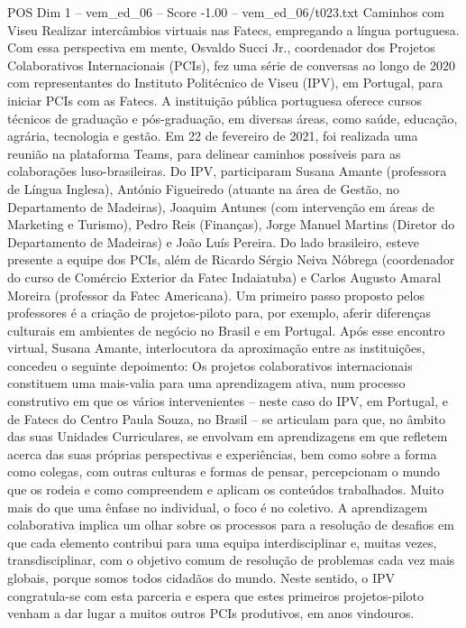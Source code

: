 \begin{textsample}{POS Dim 1 – vem\_ed\_06 – Score -1.00 – vem\_ed\_06/t023.txt}  \label{ex:f1_pos_066}
Caminhos com Viseu Realizar intercâmbios virtuais nas Fatecs, empregando a língua portuguesa.
Com essa perspectiva em mente, Osvaldo Succi Jr., coordenador dos Projetos Colaborativos Internacionais (PCIs), fez uma série de conversas ao longo de 2020 com representantes do Instituto Politécnico de Viseu (IPV), em Portugal, para iniciar PCIs com as Fatecs.
A instituição pública portuguesa oferece cursos técnicos de graduação e pós-graduação, em diversas áreas, como saúde, educação, agrária, tecnologia e gestão.
Em 22 de fevereiro de 2021, foi realizada uma reunião na plataforma Teams, para delinear caminhos possíveis para as colaborações luso-brasileiras.
Do IPV, participaram Susana Amante (professora de Língua Inglesa), António Figueiredo (atuante na área de Gestão, no Departamento de Madeiras), Joaquim Antunes (com intervenção em áreas de Marketing e Turismo), Pedro Reis (Finanças), Jorge Manuel Martins (Diretor do Departamento de Madeiras) e João Luís Pereira.
Do lado brasileiro, esteve presente a equipe dos PCIs, além de Ricardo Sérgio Neiva Nóbrega (coordenador do curso de Comércio Exterior da Fatec Indaiatuba) e Carlos Augusto Amaral Moreira (professor da Fatec Americana).
Um primeiro passo proposto pelos professores é a criação de projetos-piloto para, por exemplo, aferir diferenças culturais em ambientes de negócio no Brasil e em Portugal.
Após esse encontro virtual, Susana Amante, interlocutora da aproximação entre as instituições, concedeu o seguinte depoimento: Os projetos colaborativos internacionais constituem uma mais-valia para uma aprendizagem ativa, num processo construtivo em que os vários intervenientes – neste caso do IPV, em Portugal, e de Fatecs do Centro Paula Souza, no Brasil – se articulam para que, no âmbito das suas Unidades Curriculares, se envolvam em aprendizagens em que refletem acerca das suas próprias perspectivas e experiências, bem como sobre a forma como colegas, com outras culturas e formas de pensar, percepcionam o mundo que os rodeia e como compreendem e aplicam os conteúdos trabalhados.
Muito mais do que uma ênfase no individual, o foco é no coletivo.
A aprendizagem colaborativa implica um olhar sobre os processos para a resolução de desafios em que cada elemento contribui para uma equipa interdisciplinar e, muitas vezes, transdisciplinar, com o objetivo comum de resolução de problemas cada vez mais globais, porque somos todos cidadãos do mundo.
Neste sentido, o IPV congratula-se com esta parceria e espera que estes primeiros projetos-piloto venham a dar lugar a muitos outros PCIs produtivos, em anos vindouros.

\end{textsample}
